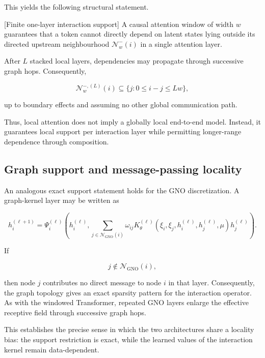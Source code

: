 This yields the following structural statement.

[Finite one-layer interaction support] A causal attention window of width \(w\) guarantees that a token cannot directly depend on latent states lying outside its directed upstream neighbourhood \(\mathcal{N}_{w}^{-} ( i )\) in a single attention layer.

After \(L\) stacked local layers, dependencies may propagate through successive graph hops. Consequently,

\begin{equation}
\label{eq:254}
\mathcal N_w^{-,(L)}(i)\subseteq\{j:0\le i-j\le Lw\},
\end{equation}

up to boundary effects and assuming no other global communication path.

Thus, local attention does not imply a globally local end-to-end model. Instead, it guarantees local support per interaction layer while permitting longer-range dependence through composition.

\subsection{Graph support and message-passing locality}
\label{sec:auxiliary_theoretical_results_graph_support_and_message_passing_locality}

An analogous exact support statement holds for the GNO discretization. A graph-kernel layer may be written as

\begin{equation}
\label{eq:255}
h_i^{(\ell+1)}=\Psi_i^{(\ell)}\left(h_i^{(\ell)},\sum_{j\in\mathcal N_{\mathrm{GNO}}(i)}\omega_{ij}K_{\theta}^{(\ell)}(\xi_i,\xi_j,h_i^{(\ell)},h_j^{(\ell)},\mu)h_j^{(\ell)}\right).
\end{equation}

If

\begin{equation}
\label{eq:256}
j\notin\mathcal N_{\mathrm{GNO}}(i),
\end{equation}

then node \(j\) contributes no direct message to node \(i\) in that layer. Consequently, the graph topology gives an exact sparsity pattern for the interaction operator. As with the windowed Transformer, repeated GNO layers enlarge the effective receptive field through successive graph hops.

This establishes the precise sense in which the two architectures share a locality bias: the support restriction is exact, while the learned values of the interaction kernel remain data-dependent.

